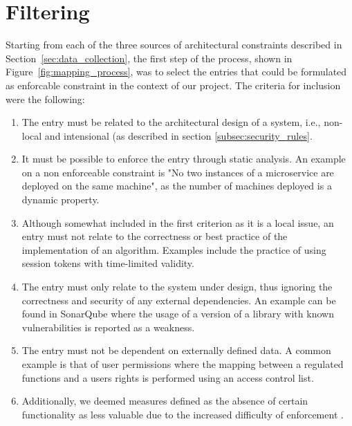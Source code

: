 \section{Filtering}\label{sec:processing}

Starting from each of the three sources of architectural constraints described in Section~\ref{sec:data_collection}, the first step of the process, shown in Figure~\ref{fig:mapping_process}, was to select the entries that could be formulated as enforcable constraint in the context of our project. The criteria for inclusion were the following: 

\begin{enumerate}
    \item The entry must be related to the architectural design of a system, i.e., non-local and intensional (as described in section \ref{subsec:security_rules}. \label{criterion_1}
    \item It must be possible to enforce the entry through static analysis. An example on a non enforceable constraint is "No two instances of a microservice are deployed on the same machine", as the number of machines deployed is a dynamic property. \label{criterion_2}
    \item Although somewhat included in the first criterion as it is a local issue, an entry must not relate to the correctness or best practice of the implementation of an algorithm. Examples include the practice of using session tokens with time-limited validity. \label{criterion_3}
    \item The entry must only relate to the system under design, thus ignoring the correctness and security of any external dependencies. An example can be found in SonarQube where the usage of a version of a library with known vulnerabilities is reported as a weakness. \label{criterion_4}
    \item The entry must not be dependent on externally defined data. A common example is that of user permissions where the mapping between a regulated functions and a users rights is performed using an access control list. \label{criterion_5}
    \item Additionally, we deemed measures defined as the absence of certain functionality as less valuable due to the increased difficulty of enforcement \cite{haley_security_2008}.
\end{enumerate}

